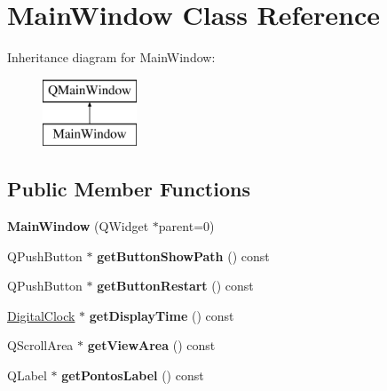 \hypertarget{class_main_window}{}\section{Main\+Window Class Reference}
\label{class_main_window}
Inheritance diagram for Main\+Window\+:\begin{figure}[H]
\begin{center}
\leavevmode
\includegraphics[height=2.000000cm]{class_main_window}
\end{center}
\end{figure}
\subsection*{Public Member Functions}
\begin{DoxyCompactItemize}
\item 
\hypertarget{class_main_window_a8b244be8b7b7db1b08de2a2acb9409db}{}{\bfseries Main\+Window} (Q\+Widget $\ast$parent=0)\label{class_main_window_a8b244be8b7b7db1b08de2a2acb9409db}

\item 
\hypertarget{class_main_window_aff62d9c195294976887758c1598860de}{}Q\+Push\+Button $\ast$ {\bfseries get\+Button\+Show\+Path} () const \label{class_main_window_aff62d9c195294976887758c1598860de}

\item 
\hypertarget{class_main_window_aa5896674ffa88c466f0c8f525c936c3f}{}Q\+Push\+Button $\ast$ {\bfseries get\+Button\+Restart} () const \label{class_main_window_aa5896674ffa88c466f0c8f525c936c3f}

\item 
\hypertarget{class_main_window_a30e41018550c20618efc5acffe4cfb75}{}\hyperlink{class_digital_clock}{Digital\+Clock} $\ast$ {\bfseries get\+Display\+Time} () const \label{class_main_window_a30e41018550c20618efc5acffe4cfb75}

\item 
\hypertarget{class_main_window_a7cb8302f9f923a3f8d4db12b1dfcc6bf}{}Q\+Scroll\+Area $\ast$ {\bfseries get\+View\+Area} () const \label{class_main_window_a7cb8302f9f923a3f8d4db12b1dfcc6bf}

\item 
\hypertarget{class_main_window_a8422d215fa6396b1f8a8bb79540e6002}{}Q\+Label $\ast$ {\bfseries get\+Pontos\+Label} () const \label{class_main_window_a8422d215fa6396b1f8a8bb79540e6002}

\end{DoxyCompactItemize}
